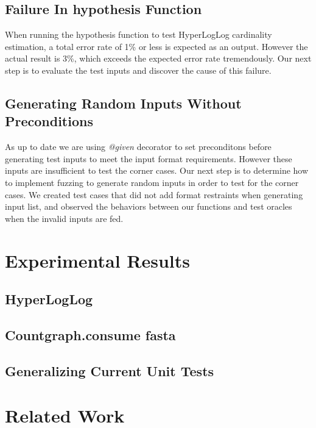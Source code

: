 \documentclass[preprint,nocopyrightspace]{sig-alternate}
\begin{document}
\subsection{Failure In hypothesis Function}
When running the hypothesis function to test HyperLogLog cardinality estimation, 
a total error rate of 1\% or less is expected as an output. 
However the actual result is 3\%, 
which exceeds the expected error rate tremendously. 
Our next step is to evaluate the test inputs and discover the cause of this failure.

\subsection{Generating Random Inputs Without Preconditions}
As up to date we are using \emph{@given} decorator to set preconditons before generating test inputs to meet the input format requirements. 
However these inputs are insufficient to test the corner cases. 
Our next step is to determine how to implement fuzzing to generate random inputs in order to test for the corner cases.
We created test cases that did not add format restraints when generating input list,
and observed the behaviors between our functions and test oracles when the invalid inputs are fed.

\section{Experimental Results}

\subsection{HyperLogLog}

\subsection{Countgraph.consume fasta}

\subsection{Generalizing Current Unit Tests}

\section{Related Work}
\end{document}
